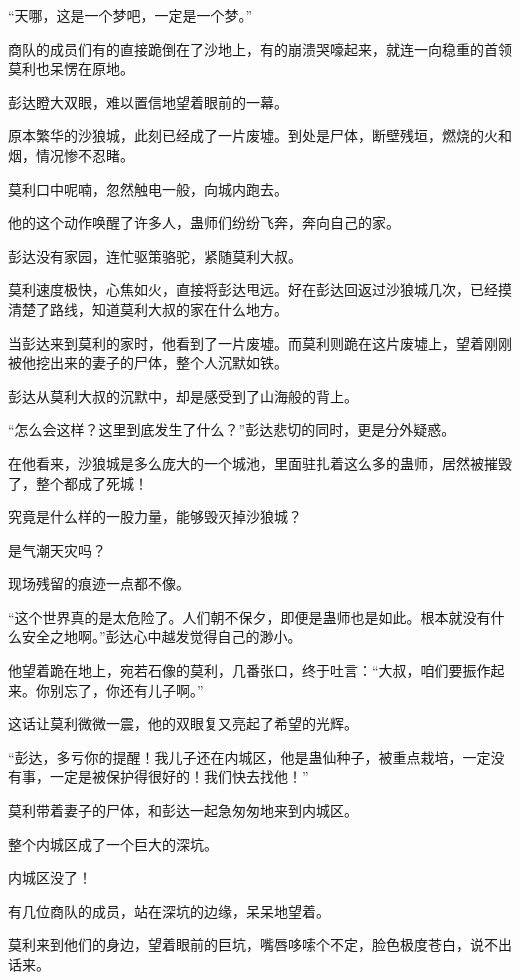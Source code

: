 \begin{this_body}
“天哪，这是一个梦吧，一定是一个梦。”

商队的成员们有的直接跪倒在了沙地上，有的崩溃哭嚎起来，就连一向稳重的首领莫利也呆愣在原地。

彭达瞪大双眼，难以置信地望着眼前的一幕。

原本繁华的沙狼城，此刻已经成了一片废墟。到处是尸体，断壁残垣，燃烧的火和烟，情况惨不忍睹。

莫利口中呢喃，忽然触电一般，向城内跑去。

他的这个动作唤醒了许多人，蛊师们纷纷飞奔，奔向自己的家。

彭达没有家园，连忙驱策骆驼，紧随莫利大叔。

莫利速度极快，心焦如火，直接将彭达甩远。好在彭达回返过沙狼城几次，已经摸清楚了路线，知道莫利大叔的家在什么地方。

当彭达来到莫利的家时，他看到了一片废墟。而莫利则跪在这片废墟上，望着刚刚被他挖出来的妻子的尸体，整个人沉默如铁。

彭达从莫利大叔的沉默中，却是感受到了山海般的背上。

“怎么会这样？这里到底发生了什么？”彭达悲切的同时，更是分外疑惑。

在他看来，沙狼城是多么庞大的一个城池，里面驻扎着这么多的蛊师，居然被摧毁了，整个都成了死城！

究竟是什么样的一股力量，能够毁灭掉沙狼城？

是气潮天灾吗？

现场残留的痕迹一点都不像。

“这个世界真的是太危险了。人们朝不保夕，即便是蛊师也是如此。根本就没有什么安全之地啊。”彭达心中越发觉得自己的渺小。

他望着跪在地上，宛若石像的莫利，几番张口，终于吐言：“大叔，咱们要振作起来。你别忘了，你还有儿子啊。”

这话让莫利微微一震，他的双眼复又亮起了希望的光辉。

“彭达，多亏你的提醒！我儿子还在内城区，他是蛊仙种子，被重点栽培，一定没有事，一定是被保护得很好的！我们快去找他！”

莫利带着妻子的尸体，和彭达一起急匆匆地来到内城区。

整个内城区成了一个巨大的深坑。

内城区没了！

有几位商队的成员，站在深坑的边缘，呆呆地望着。

莫利来到他们的身边，望着眼前的巨坑，嘴唇哆嗦个不定，脸色极度苍白，说不出话来。


\end{this_body}
